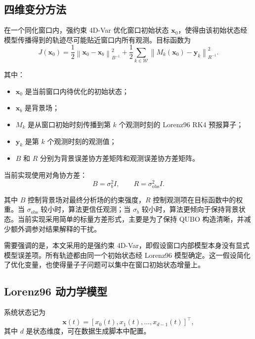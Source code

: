 \documentclass[UTF8,a4paper,12pt]{ctexart}
\begin{document}
\subsection{四维变分方法}

在一个同化窗口内，强约束 4D-Var 优化窗口初始状态 $\bm{x}_0$，使得由该初始状态经模型传播得到的轨迹尽可能贴近窗口内所有观测。目标函数为
\begin{equation}
  J(\bm{x}_0)
  =
  \frac{1}{2}
  \left\|
    \bm{x}_0 - \bm{x}_b
  \right\|_{B^{-1}}^2
  +
  \frac{1}{2}
  \sum_{k \in \mathcal{W}}
  \left\|
    M_k(\bm{x}_0) - \bm{y}_k
  \right\|_{R^{-1}}^2 .
  \label{eq:4dvar}
\end{equation}

其中：
\begin{itemize}
  \item $\bm{x}_0$ 是当前窗口内待优化的初始状态；
  \item $\bm{x}_b$ 是背景场；
  \item $M_k$ 是从窗口初始时刻传播到第 $k$ 个观测时刻的 Lorenz96 RK4 预报算子；
  \item $\bm{y}_k$ 是第 $k$ 个观测时刻的观测值；
  \item $B$ 和 $R$ 分别为背景误差协方差矩阵和观测误差协方差矩阵。
\end{itemize}

当前实现使用对角协方差：
\begin{equation}
  B = \sigma_b^2 I,
  \qquad
  R = \sigma_{\mathrm{obs}}^2 I.
\end{equation}

其中 $B$ 控制背景场对最终分析场的约束强度，$R$ 控制观测项在目标函数中的权重。当 $\sigma_{\mathrm{obs}}$ 较小时，算法更信任观测；当 $\sigma_b$ 较小时，算法更倾向于保持背景状态。当前实现采用简单的标量方差形式，主要是为了保持 QUBO 构造清晰，并减少额外调参对结果解释的干扰。

需要强调的是，本文采用的是强约束 4D-Var，即假设窗口内部模型本身没有显式模型误差项。所有轨迹都由同一个初始状态经 Lorenz96 模型确定。这一假设简化了优化变量，也使得量子子问题可以集中在窗口初始状态增量上。


\subsection{Lorenz96 动力学模型}

系统状态记为
\begin{equation}
  \bm{x}(t) = \left[x_0(t), x_1(t), \ldots, x_{d-1}(t)\right]^\top ,
\end{equation}
其中 $d$ 是状态维度，可在数据生成脚本中配置。
\end{document}
